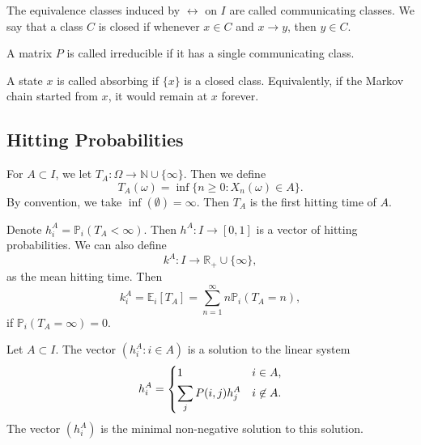 \documentclass[12pt]{article}
\begin{document}
\begin{definition}
	The equivalence classes induced by $\leftrightarrow$ on $I$ are called communicating classes. We say that a class $C$ is closed if whenever $x \in C$ and $x \to y$, then $y \in C$.

	A matrix $P$ is called irreducible if it has a single communicating class.

	A state $x$ is called absorbing if $\{x\}$ is a closed class. Equivalently, if the Markov chain started from $x$, it would remain at $x$ forever.
\end{definition}

\subsection{Hitting Probabilities}%
\label{sub:hitting_probabilities}

\begin{definition}
	For $A \subset I$, we let $T_A : \Omega \to \mathbb{N} \cup \{\infty\}$. Then we define
	\[
		T_A(\omega) = \inf \{n \geq 0 : X_n(\omega) \in A\}
	.\]
	By convention, we take $\inf(\emptyset) = \infty$. Then $T_A$ is the first hitting time of $A$.

	Denote $h_i^{A} = \mathbb{P}_i(T_A < \infty)$. Then $h^{A} : I \to [0, 1]$ is a vector of hitting probabilities. We can also define
	\[
		k^{A} : I \to \mathbb{R}_+ \cup \{\infty\}
	,\]
	as the mean hitting time. Then
	\[
		k_i^{A} = \mathbb{E}_i[T_A] = \sum_{n =  1}^{\infty }n \mathbb{P}_i(T_A = n)
	,\]
	if $\mathbb{P}_i(T_A = \infty) = 0$.
\end{definition}

\begin{theorem}
	Let $A \subset I$. The vector $(h_i^{A} : i \in A)$ is a solution to the linear system
	\[
	h_i^{A} =
	\begin{dcases}
		1 & i \in A, \\
		\sum_{j}P(i, j) h_j^{A} & i \not \in A.
	\end{dcases}
	\]
	The vector $(h_i^{A})$ is the minimal non-negative solution to this solution.
\end{theorem}
\end{document}
